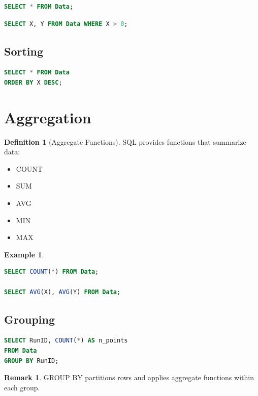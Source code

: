 \documentclass[12pt,oneside]{book}
\numberwithin{equation}{section}
\theoremstyle{definition}
\newtheorem{definition}{Definition}[section]
\newtheorem{example}{Example}[section]
\newtheorem{remark}{Remark}[section]
\theoremstyle{plain}
\theoremstyle{remark}
\begin{document}
\begin{lstlisting}[language=SQL]
SELECT * FROM Data;
\end{lstlisting}

\begin{lstlisting}[language=SQL]
SELECT X, Y FROM Data WHERE X > 0;
\end{lstlisting}

\subsection{Sorting}

\begin{lstlisting}[language=SQL]
SELECT * FROM Data
ORDER BY X DESC;
\end{lstlisting}

\section{Aggregation}

\begin{definition}[Aggregate Functions]
SQL provides functions that summarize data:
\begin{itemize}
    \item COUNT
    \item SUM
    \item AVG
    \item MIN
    \item MAX
\end{itemize}
\end{definition}

\begin{example}
\begin{lstlisting}[language=SQL]
SELECT COUNT(*) FROM Data;

SELECT AVG(X), AVG(Y) FROM Data;
\end{lstlisting}
\end{example}

\subsection{Grouping}

\begin{lstlisting}[language=SQL]
SELECT RunID, COUNT(*) AS n_points
FROM Data
GROUP BY RunID;
\end{lstlisting}

\begin{remark}
GROUP BY partitions rows and applies aggregate functions within each group.
\end{remark}
\end{document}
